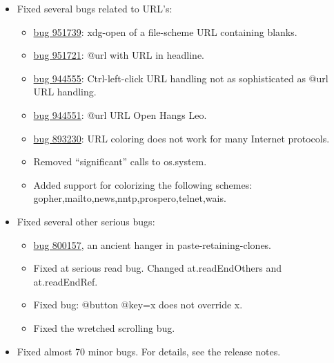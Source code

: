 \documentclass[a4paper,10pt,english]{sphinxmanual}
\begin{document}
\begin{itemize}
\item {} 
Fixed several bugs related to URL's:
\begin{itemize}
\item {} 
\href{https://bugs.launchpad.net/leo-editor/+bug/951739}{bug 951739}: xdg-open of a file-scheme URL containing blanks.

\item {} 
\href{https://bugs.launchpad.net/leo-editor/+bug/951721}{bug 951721}: @url with URL in headline.

\item {} 
\href{https://bugs.launchpad.net/leo-editor/+bug/944555}{bug 944555}: Ctrl-left-click URL handling not as sophisticated as @url URL handling.

\item {} 
\href{https://bugs.launchpad.net/leo-editor/+bug/944551}{bug 944551}: @url URL Open Hangs Leo.

\item {} 
\href{https://bugs.launchpad.net/leo-editor/+bug/893230}{bug 893230}: URL coloring does not work for many Internet protocols.

\item {} 
Removed ``significant'' calls to os.system.

\item {} 
Added support for colorizing the following schemes:
gopher,mailto,news,nntp,prospero,telnet,wais.

\end{itemize}

\item {} 
Fixed several other serious bugs:
\begin{itemize}
\item {} 
\href{https://bugs.launchpad.net/leo-editor/+bug/800157}{bug 800157}, an ancient hanger in paste-retaining-clones.

\item {} 
Fixed at serious read bug. Changed at.readEndOthers and at.readEndRef.

\item {} 
Fixed bug: @button @key=x does not override x.

\item {} 
Fixed the wretched scrolling bug.

\end{itemize}

\item {} 
Fixed almost 70 minor bugs. For details, see the release notes.

\end{itemize}
\end{document}
